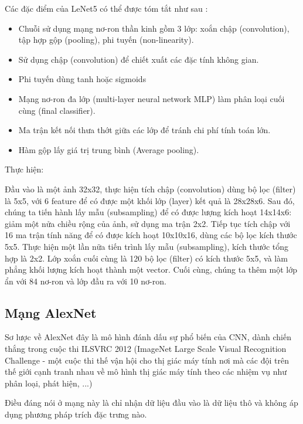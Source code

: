 Các đặc điểm của LeNet5 có thể được tóm tắt như sau \cite{lenet5}:

\begin{itemize}
\item Chuỗi sử dụng mạng nơ-ron thần kinh gồm 3 lớp: xoắn chập (convolution), tập hợp gộp (pooling), phi  tuyến (non-linearity).
\item Sử dụng chập (convolution) để chiết xuất các đặc tính không gian.
\item Phi tuyến dùng tanh hoặc sigmoids
\item Mạng nơ-ron đa lớp (multi-layer neural network MLP) làm phân loại cuối cùng (final classifier).
\item Ma trận kết nối thưa thớt giữa các lớp để tránh chi phí tính toán lớn.
\item Hàm gộp lấy giá trị trung bình (Average pooling).
\end{itemize}

Thực hiện:

Đầu vào là một ảnh 32x32, thực hiện tích chập (convolution) dùng bộ lọc (filter) là 5x5, với 6 feature để có được một khối lớp (layer) kết quả là 28x28x6. Sau đó, chúng ta tiến hành lấy mẫu (subsampling) để có được lượng kích hoạt 14x14x6: giảm một nửa chiều rộng của ảnh, sử dụng  ma trận 2x2.  Tiếp tục tích chập với 16 ma trận tính năng để có được kích hoạt 10x10x16, dùng các bộ lọc kích thước 5x5. Thực hiện một lần nữa tiến trình lấy mẫu (subsampling), kích thước tổng hợp là 2x2. Lớp xoắn cuối cùng là 120 bộ lọc (filter) có kích thước 5x5, và làm phẳng khối lượng kích hoạt thành một vector. Cuối cùng, chúng ta thêm một lớp ẩn với 84 nơ-ron và lớp đầu ra với 10 nơ-ron.

\subsection{Mạng AlexNet}

Sơ  lược về AlexNet đây là mô hình đánh dấu sự phổ biến của CNN, dành chiến thắng trong cuộc thi ILSVRC 2012 (ImageNet Large Scale Visual Recognition Challenge - một cuộc thi thế vận hội cho thị giác máy tính nơi mà các đội trên thế giới cạnh tranh nhau về mô hình thị giác máy tính theo các nhiệm vụ như phân loại, phát hiện, ...)

Điều đáng nói ở mạng này là chỉ nhận dữ liệu đầu vào là dữ liệu thô và không áp dụng phương pháp trích đặc trưng nào.

